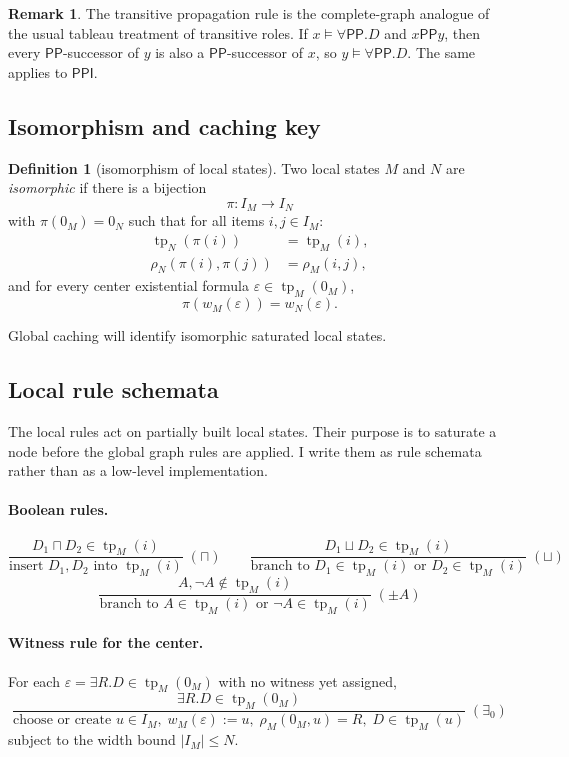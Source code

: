 \documentclass[11pt]{article}
\theoremstyle{definition}
\newtheorem{definition}[theorem]{Definition}
\newtheorem{remark}[theorem]{Remark}
\newcommand{\tp}{\operatorname{tp}}
\newcommand{\Pp}{\mathsf{PP}}
\newcommand{\Ppi}{\mathsf{PPI}}
\begin{document}
\begin{remark}
The transitive propagation rule is the complete-graph analogue of the usual tableau treatment of transitive roles. If $x\models \forall \Pp.D$ and $x\Pp y$, then every $\Pp$-successor of $y$ is also a $\Pp$-successor of $x$, so $y\models \forall \Pp.D$. The same applies to $\Ppi$.
\end{remark}

\subsection{Isomorphism and caching key}

\begin{definition}[isomorphism of local states]
Two local states $M$ and $N$ are \emph{isomorphic} if there is a bijection
\[
\pi:I_M\to I_N
\]
with $\pi(0_M)=0_N$ such that for all items $i,j\in I_M$:
\begin{align*}
\tp_N(\pi(i)) &= \tp_M(i),\\
\rho_N(\pi(i),\pi(j)) &= \rho_M(i,j),
\end{align*}
and for every center existential formula $\varepsilon\in \tp_M(0_M)$,
\[
\pi(w_M(\varepsilon))=w_N(\varepsilon).
\]
\end{definition}

Global caching will identify isomorphic saturated local states.

\subsection{Local rule schemata}

The local rules act on partially built local states. Their purpose is to saturate a node before the global graph rules are applied. I write them as rule schemata rather than as a low-level implementation.

\paragraph{Boolean rules.}
\[
\frac{D_1\sqcap D_2\in \tp_M(i)}{\text{insert }D_1,D_2\text{ into }\tp_M(i)}\; (\sqcap)
\qquad
\frac{D_1\sqcup D_2\in \tp_M(i)}{\text{branch to }D_1\in \tp_M(i)\text{ or }D_2\in \tp_M(i)}\; (\sqcup)
\]
\[
\frac{A,\neg A\notin \tp_M(i)}{\text{branch to }A\in \tp_M(i)\text{ or }\neg A\in \tp_M(i)}\; (\pm A)
\]

\paragraph{Witness rule for the center.}
For each $\varepsilon=\exists R.D\in \tp_M(0_M)$ with no witness yet assigned,
\[
\frac{\exists R.D\in \tp_M(0_M)}{\text{choose or create }u\in I_M,\; w_M(\varepsilon):=u,\; \rho_M(0_M,u)=R,\; D\in \tp_M(u)}\; (\exists_0)
\]
subject to the width bound $|I_M|\leq N$.
\end{document}
